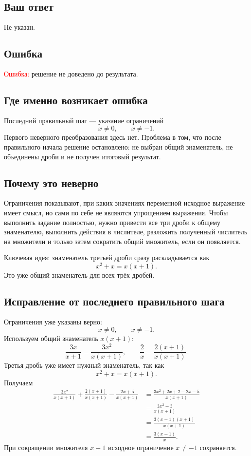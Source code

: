 \documentclass[12pt,a4paper]{article}
\begin{document}
\subsection*{Ваш ответ}
Не указан.

\subsection*{Ошибка}
\textcolor{red}{Ошибка:} решение не доведено до результата.

\subsection*{Где именно возникает ошибка}
Последний правильный шаг --- указание ограничений
\[
x\ne0,
\qquad
x\ne-1.
\]
Первого неверного преобразования здесь нет. Проблема в том, что после правильного начала решение остановлено: не выбран общий знаменатель, не объединены дроби и не получен итоговый результат.

\subsection*{Почему это неверно}
Ограничения показывают, при каких значениях переменной исходное выражение имеет смысл, но сами по себе не являются упрощением выражения. Чтобы выполнить задание полностью, нужно привести все три дроби к общему знаменателю, выполнить действия в числителе, разложить полученный числитель на множители и только затем сократить общий множитель, если он появляется.

\textcolor{blue!60!black}{Ключевая идея:} знаменатель третьей дроби сразу раскладывается как
\[
x^2+x=x(x+1).
\]
Это уже общий знаменатель для всех трёх дробей.

\subsection*{Исправление от последнего правильного шага}
Ограничения уже указаны верно:
\[
x\ne0,
\qquad
x\ne-1.
\]
Используем общий знаменатель $x(x+1)$:
\[
\frac{3x}{x+1}
=
\frac{3x^2}{x(x+1)},
\qquad
\frac{2}{x}
=
\frac{2(x+1)}{x(x+1)}.
\]
Третья дробь уже имеет нужный знаменатель, так как
\[
x^2+x=x(x+1).
\]
Получаем
\begin{align*}
\frac{3x^2}{x(x+1)}
+
\frac{2(x+1)}{x(x+1)}
-
\frac{2x+5}{x(x+1)}
&=
\frac{3x^2+2x+2-2x-5}{x(x+1)}\\
&=
\frac{3x^2-3}{x(x+1)}\\
&=
\frac{3(x-1)(x+1)}{x(x+1)}\\
&=
\frac{3(x-1)}{x}.
\end{align*}
При сокращении множителя $x+1$ исходное ограничение $x\ne-1$ сохраняется.
\end{document}
